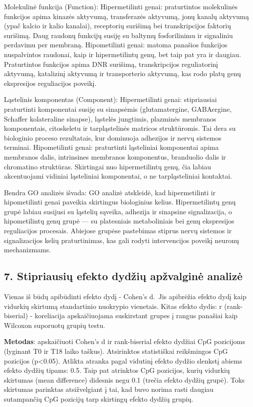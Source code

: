 \documentclass[
]{article}
\begin{document}
Molekulinė funkcija (Function): Hipermetilinti genai: praturtintos
molekulinės funkcijos apima kinazės aktyvumą, transferazės aktyvumą,
jonų kanalų aktyvumą (ypač kalcio ir kalio kanalai), receptorių surišimą
bei transkripcijos faktorių surišimą. Daug raudonų funkcijų susiję su
baltymų fosforilinimu ir signaliniu perdavimu per membraną.
Hipometilinti genai: matoma panašios funkcijos nuspalvintos raudonai,
kaip ir hipermetilintų genų, bet taip pat yra ir daugiau. Praturtintos
funkcijos apima DNR surišimą, transkripcijos reguliatorinį aktyvumą,
katalizinį aktyvumą ir transporterio aktyvumą, kas rodo platų genų
ekspresijos reguliacijos poveikį.

Ląstelinis komponentas (Component): Hipermetilinti genai: stipriausiai
praturtinti komponentai susiję su sinapsėmis (glutamatergine,
GABAergine, Schaffer kolateraline sinapse), ląstelės jungtimis,
plazminės membranos komponentais, citoskeletu ir tarpląstelinės matricos
struktūromis. Tai dera su biologinio proceso rezultatais, kur dominuoja
adhezijos ir nervų sistemos terminai. Hipometilinti genai: praturtinti
ląsteliniai komponentai apima membranos dalis, intrinsines membranos
komponentus, branduolio dalis ir chromatino struktūras. Skirtingai nuo
hipermetilintų genų, čia labiau akcentuojami vidiniai ląsteliniai
komponentai, o ne tarpląsteliniai kontaktai.

Bendra GO analizės išvada: GO analizė atskleidė, kad hipermetilinti ir
hipometilinti genai paveikia skirtingus biologinius kelius.
Hipermetilintų genų grupė labiau susijusi su ląstelių sąveika, adhezija
ir sinapsine signalizacija, o hipometilintų genų grupė --- su
platesniais metaboliniais bei genų ekspresijos reguliacijos procesais.
Abiejose grupėse pastebimas stiprus nervų sistemos ir signalizacijos
kelių praturtinimas, kas gali rodyti intervencijos poveikį neuronų
mechanizmams.

\subsection{7. Stipriausių efekto dydžių apžvalginė
analizė}\label{stipriausiux173-efekto-dydux17eiux173-apux17evalginux117-analizux117}

Vienas iš būdų apibūdinti efekto dydį - Cohen's d.~Jis apibrėžia efekto
dydį kaip vidurkių skirtumą standartinio nuokrypio vienetais. Kitas
efekto dydis: r (rank-biserial) - koreliacija apskaičiuojama suskirstant
grupes į rangus panašiai kaip Wilcoxon suporuotų grupių testu.

\textbf{Metodas}: apskaičiuoti Cohen's d ir rank-biserial efekto dydžiai
CpG pozicijoms (lyginant T0 ir T18 laiko taškus). Atsirinktos
statistiškai reikšmingos CpG pozicijos (p\textless0.05). Atlikta atranka
pagal vidutinį efekto dydžio slenkstį abiems efekto dydžių tipams: 0.5.
Taip pat atrinktos CpG pozicijos, kurių vidurkių skirtumas (mean
difference) didesnis negu 0.1 (trečia efekto dydžių grupė). Toks
skirtumas parinktas atsižvelgiant į tai, kad buvo norima rasti daugiau
sutampančių CpG pozicijų tarp skirtingų efekto dydžių grupių.
\end{document}
